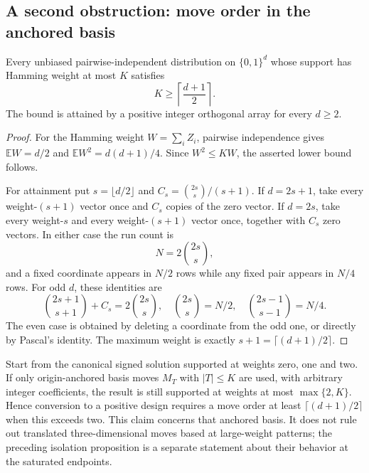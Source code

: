 \subsection{A second obstruction: move order in the anchored basis}
\begin{proposition}
Every unbiased pairwise-independent distribution on $\{0,1\}^d$ whose
support has Hamming weight at most $K$ satisfies
\[
 K\ge\left\lceil\frac{d+1}{2}\right\rceil.
\]
The bound is attained by a positive integer orthogonal array for every
$d\ge2$.
\end{proposition}
\begin{proof}
For the Hamming weight $W=\sum_i Z_i$, pairwise independence gives
$\mathbb EW=d/2$ and $\mathbb EW^2=d(d+1)/4$. Since $W^2\le KW$,
the asserted lower bound follows.

For attainment put $s=\lfloor d/2\rfloor$ and
$C_s=\binom{2s}{s}/(s+1)$. If $d=2s+1$, take every weight-$(s+1)$
vector once and $C_s$ copies of the zero vector. If $d=2s$, take every
weight-$s$ and every weight-$(s+1)$ vector once, together with $C_s$
zero vectors. In either case the run count is
\[
 N=2\binom{2s}{s},
\]
and a fixed coordinate appears in $N/2$ rows while any fixed pair
appears in $N/4$ rows. For odd $d$, these identities are
\[
 \binom{2s+1}{s+1}+C_s=2\binom{2s}{s},\quad
 \binom{2s}{s}=N/2,\quad
 \binom{2s-1}{s-1}=N/4.
\]
The even case is obtained by deleting a coordinate from the odd one,
or directly by Pascal's identity. The maximum weight is exactly
$s+1=\lceil(d+1)/2\rceil$.
\end{proof}

Start from the canonical signed solution supported at weights zero,
one and two. If only origin-anchored basis moves $M_T$ with $|T|\le K$
are used, with arbitrary integer coefficients, the result is still
supported at weights at most $\max\{2,K\}$. Hence conversion to a positive
design requires a move order at least $\lceil(d+1)/2\rceil$ when this
exceeds two. This claim concerns that anchored basis. It does not rule
out translated three-dimensional moves based at large-weight patterns;
the preceding isolation proposition is a separate statement about their
behavior at the saturated endpoints.

